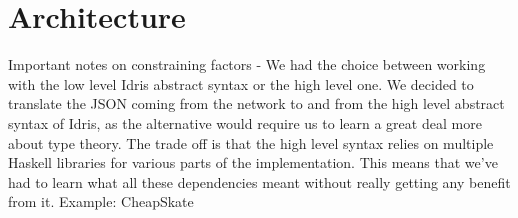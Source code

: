 \section{Architecture}
\label{sec:Architecture}



Important notes on constraining factors
  - We had the choice between working with the low level Idris abstract syntax or the high level one. We decided to translate the JSON coming from the network to and from the high level abstract syntax of Idris, as the alternative would require us to learn a great deal more about type theory. The trade off is that the high level syntax relies on multiple Haskell libraries for various parts of the implementation. This means that we’ve had to learn what all these dependencies meant without really getting any benefit from it. Example: CheapSkate

